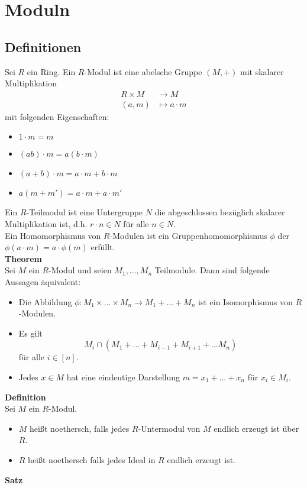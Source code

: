 \documentclass[a4paper, 12pt]{article}
\begin{document}
\section{Moduln}
\subsection{Definitionen}
Sei $R$ ein Ring. Ein $R$-Modul ist eine abelsche Gruppe $(M,+)$ mit skalarer Multiplikation \begin{align*}
	R\times M &\to M\\
	(a,m) &\mapsto a\cdot m
\end{align*}
mit folgenden Eigenschaften: \begin{itemize}
	\item $1\cdot m = m$
	\item $(ab)\cdot m = a(b\cdot m)$
	\item $(a+b) \cdot m = a\cdot m + b \cdot m$
	\item $a(m+m') = a\cdot m + a \cdot m'$ 
\end{itemize}
Ein $R$-Teilmodul ist eine Untergruppe $N$ die abgeschlossen bezüglich skalarer Multiplikation ist, d.h. $r\cdot n \in N$ für alle $n \in N$.\\
Ein Homomorphismus von $R$-Modulen ist ein Gruppenhomomorphismus $\phi$ der $\phi(a\cdot m) = a\cdot \phi(m)$ erfüllt.\\
\textbf{Theorem}\\
Sei $M$ ein $R$-Modul und seien $M_1,...,M_n$ Teilmodule. Dann sind folgende Aussagen äquivalent: \begin{itemize}
	\item Die Abbildung $\phi: M_1 \times ... \times M_n \to M_1+...+M_n$ ist ein Isomorphismus von $R$-Modulen.
	\item Es gilt \[M_i \cap (M_1+...+M_{i-1} + M_{i+1} + ... M_n)\]
	für alle $i \in [n]$.
	\item Jedes $x \in M$ hat eine eindeutige Darstellung $m = x_1+...+x_n$ für $x_i \in M_i$.
\end{itemize} 
\textbf{Definition}\\
Sei $M$ ein $R$-Modul. \begin{itemize}
	\item $M$ heißt noethersch, falls jedes $R$-Untermodul von $M$ endlich erzeugt ist über $R$.
	\item $R$ heißt noethersch falls jedes Ideal in $R$ endlich erzeugt ist.
\end{itemize}
\textbf{Satz}\\
\end{document}

